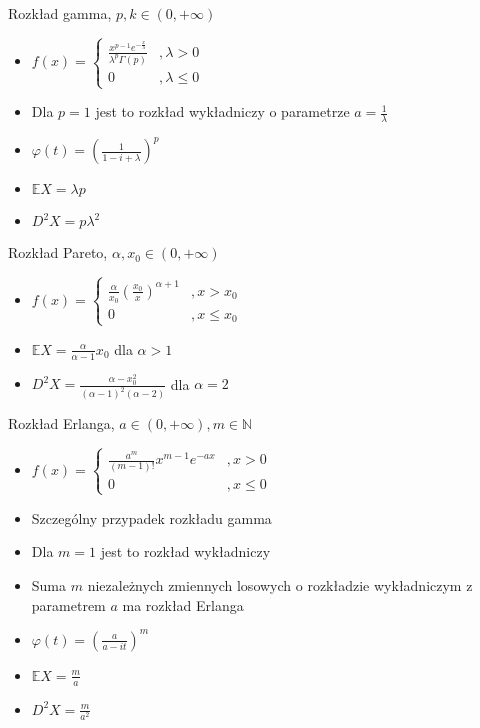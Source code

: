 \documentclass[a4paper,12pt]{report}
\theoremstyle{break}
\theoremstyle{definition}
\theoremstyle{defi}
\theoremstyle{break}
\theoremstyle{defi}
\begin{document}
{\Large Rozkład gamma, $ p,k\in\left(0,+\infty \right) $}
\begin{multicols}{2}
\begin{itemize}
\item $ f(x)=
\left \{
\begin{array}{ll}
\frac{x^{p-1}e^{-\frac{x}{\lambda}}}{\lambda^p\Gamma(p)}&,\lambda>0\\
0&,\lambda\le0
\end{array}
\right . $
\item Dla $ p=1 $ jest to rozkład wykładniczy o parametrze $ a=\frac{1}{\lambda} $
\item $ \varphi(t)=\left(\frac{1}{1-i+\lambda}\right)^p $
\item $ \mathbb{E}X=\lambda p $
\item $ D^2X=p\lambda^2 $
\end{itemize}
\end{multicols}
{\Large Rozkład Pareto, $ \alpha,x_0\in (0,+\infty ) $}
\begin{multicols}{2}
\begin{itemize}
\item $ f(x)=
\left \{
\begin{array}{ll}
\frac{\alpha}{x_0}\left(\frac{x_0}{x}\right)^{\alpha+1}&,x>x_0\\
0&,x\le x_0
\end{array}
\right . $
\item $ \mathbb{E}X=\frac{\alpha}{\alpha-1}x_0 $ dla $ \alpha>1 $
\item $ D^2X=\frac{\alpha-x_0^2}{(\alpha-1)^2(\alpha-2)} $ dla $ \alpha=2 $
\end{itemize}
\end{multicols}
{\Large Rozkład Erlanga, $ a\in (0,+\infty ),m\in \mathbb{N} $}
\begin{multicols}{2}
\begin{itemize}
\item $ f(x)=
\left \{
\begin{array}{ll}
\frac{a^m}{\left(m-1\right)!}x^{m-1}e^{-ax}&,x>0\\
0&,x\le0
\end{array}
\right . $
\item Szczególny przypadek rozkładu gamma
\item Dla $ m=1 $ jest to rozkład wykładniczy
\columnbreak
\item Suma $ m $ niezależnych zmiennych losowych o rozkładzie wykładniczym z parametrem $ a $ ma rozkład Erlanga
\item $ \varphi(t)=\left(\frac{a}{a-it}\right)^m $
\item $ \mathbb E X=\frac{m}{a} $
\item $ D^2X=\frac{m}{a^2} $
\end{itemize}
\end{multicols}
\end{document}
